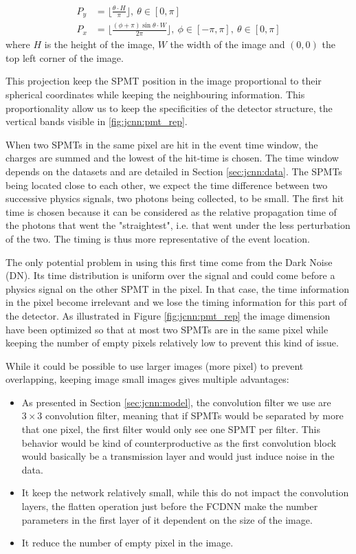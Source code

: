 \documentclass[../main.tex]{subfiles}
\begin{document}
{{\begin{align}
  P_y &= \bigg\lfloor \frac{\theta \cdot H}{\pi} \bigg\rfloor, ~ \theta \in [0, \pi] \\
  P_x &= \bigg\lfloor \frac{(\phi + \pi) \sin{\theta} \cdot W}{2\pi}\bigg\rfloor, ~ \phi \in [-\pi, \pi], ~ \theta \in [0, \pi]
\end{align}
where $H$ is the height of the image, $W$ the width of the image and $(0,0)$ the top left corner of the image.

This projection keep the SPMT position in the image proportional to their spherical coordinates while keeping the neighbouring information. This proportionality allow us to keep the specificities of the detector structure, the vertical bands visible in \ref{fig:jcnn:pmt_rep}.

When two SPMTs in the same pixel are hit in the event time window, the charges are summed and the lowest of the hit-time is chosen. The time window depends on the datasets and are detailed in Section \ref{sec:jcnn:data}. The SPMTs being located close to each other, we expect the time difference between two successive physics signals, two photons being collected, to be small. The first hit time is chosen because it can be considered as the relative propagation time of the photons that went the "straightest", i.e. that went under the less perturbation of the two. The timing is thus more representative of the event location.

The only potential problem in using this first time come from the Dark Noise (DN). Its time distribution is uniform over the signal and could come before a physics signal on the other SPMT in the pixel. In that case, the time information in the pixel become irrelevant and we lose the timing information for this part of the detector.
As illustrated in Figure \ref{fig:jcnn:pmt_rep} the image dimension have been optimized so that at most two SPMTs are in the same pixel while keeping the number of empty pixels relatively low to prevent this kind of issue.

While it could be possible to use larger images (more pixel) to prevent overlapping, keeping image small images gives multiple advantages:
\begin{itemize}
  \item As presented in Section \ref{sec:jcnn:model}, the convolution filter we use are $3 \times 3$ convolution filter, meaning that if SPMTs would be separated by more that one pixel, the first filter would only see one SPMT per filter. This behavior would be kind of counterproductive as the first convolution block would basically be a transmission layer and would just induce noise in the data.
  \item It keep the network relatively small, while this do not impact the convolution layers, the flatten operation just before the FCDNN make the number parameters in the first layer of it dependent on the size of the image.
  \item It reduce the number of empty pixel in the image.
\end{itemize}

}}
\end{document}
